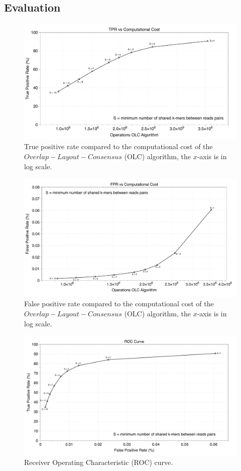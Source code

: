 \documentclass[11pt]{article}
\begin{document}
\subsection{Evaluation}
\begin{figure}
    \centering
    \includegraphics[width=\textwidth]{image/true.pdf}
    \caption{True positive rate compared to the computational cost of the $Overlap-Layout-Consensus$ (OLC) algorithm, the $x$-axis is in log scale.}
    \label{fig:true}
\end{figure}
\begin{figure}
    \centering
    \includegraphics[width=\textwidth]{image/false.pdf}
    \caption{False positive rate compared to the computational cost of the $Overlap-Layout-Consensus$ (OLC) algorithm, the $x$-axis is in log scale.}
    \label{fig:false}
\end{figure}
\begin{figure}
    \centering
    \includegraphics[width=\textwidth]{image/roc.pdf}
    \caption{Receiver Operating Characteristic (ROC) curve.}
    \label{fig:roc}
\end{figure}
\end{document}
